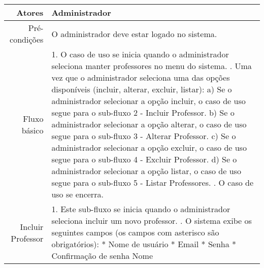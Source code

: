 \begin{longtable}{r p{12cm}}
\hline
Atores & Administrador \\ \hline
Pré-condições & O administrador deve estar logado no sistema.\\
Fluxo básico &1. O caso de uso se inicia quando o administrador seleciona manter professores no menu do sistema. \newline
                2. Uma vez que o administrador seleciona uma das opções disponíveis (incluir, alterar, excluir, listar): \newline
                \hspace*{1cm} a) Se o administrador selecionar a opção incluir, o caso de uso segue para o sub-fluxo 2 - Incluir Professor. \newline 
                \hspace*{1cm} b) Se o administrador selecionar a opção alterar, o caso de uso segue para o sub-fluxo 3 - Alterar Professor.  \newline 
                \hspace*{1cm} c) Se o administrador selecionar a opção excluir, o caso de uso segue para o sub-fluxo 4 - Excluir Professor.  \newline 
                \hspace*{1cm} d) Se o administrador selecionar a opção listar, o caso de uso segue para o sub-fluxo 5 - Listar Professores.  \newline 
                3. O caso de uso se encerra. \newline \\
Incluir Professor & 1. Este sub-fluxo se inicia quando o administrador seleciona incluir um novo professor. \newline
                    2. O sistema exibe os seguintes campos (os campos com asterisco são obrigatórios): \newline
                    \hspace*{1cm} * Nome de usuário \newline
                    \hspace*{1cm} * Email \newline
                    \hspace*{1cm} * Senha \newline
                    \hspace*{1cm} * Confirmação de senha \newline
                    \hspace*{1cm} Nome \newline

\end{longtable}
